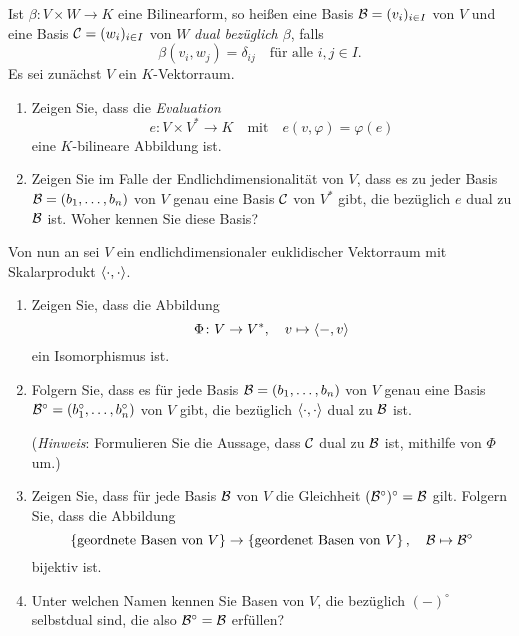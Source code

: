 \documentclass[a4paper,10pt]{scrartcl}
\begin{document}
\begin{question}
  Ist $\beta \colon V \times W \to K$ eine Bilinearform, so heißen eine Basis $\mathcal{B} = (v_i)_{i \in I}$ von $V$ und eine Basis $\mathcal{C} = (w_i)_{i \in I}$ von $W$ \emph{dual bezüglich $\beta$}, falls
  \[
    \beta(v_i, w_j) = \delta_{ij}
    \quad
    \text{für alle $i, j \in I$}.
  \]
  Es sei zunächst $V$ ein $K$-Vektorraum.
  \begin{enumerate}
    \item
      Zeigen Sie, dass die \emph{Evaluation}
      \[
        e \colon V \times V^* \to K
        \quad\text{mit}\quad
        e(v, \varphi) = \varphi(e)
      \]
      eine $K$-bilineare Abbildung ist.
    \item
      Zeigen Sie im Falle der Endlichdimensionalität von $V$, dass es zu jeder Basis $\mathcal{B} = (b_1, \dotsc, b_n)$ von $V$ genau eine Basis $\mathcal{C}$ von $V^*$ gibt, die bezüglich $e$ dual zu $\mathcal{B}$ ist.
      Woher kennen Sie diese Basis?
  \end{enumerate}
  Von nun an sei $V$ ein endlichdimensionaler euklidischer Vektorraum mit Skalarprodukt $\langle \cdot, \cdot \rangle$.
  \begin{enumerate}[resume]
    \item
      Zeigen Sie, dass die Abbildung
      \[
        \Phi \colon V \to V^*,
        \quad
        v \mapsto \langle -, v \rangle
      \]
      ein Isomorphismus ist.
    \item
      Folgern Sie, dass es für jede Basis $\mathcal{B} = (b_1, \dotsc, b_n)$ von $V$ genau eine Basis $\mathcal{B}^\circ = (b_1^\circ, \dotsc, b_n^\circ)$ von $V$ gibt, die bezüglich $\langle \cdot, \cdot \rangle$ dual zu $\mathcal{B}$ ist.
      
      (\emph{Hinweis}:
       Formulieren Sie die Aussage, dass $\mathcal{C}$ dual zu $\mathcal{B}$ ist, mithilfe von $\Phi$ um.)
    \item
      Zeigen Sie, dass für jede Basis $\mathcal{B}$ von $V$ die Gleichheit $(\mathcal{B}^\circ)^\circ = \mathcal{B}$ gilt.
      Folgern Sie, dass die Abbildung
      \[
            \left\{ \text{geordnete Basen von $V$} \right\}
        \to \left\{ \text{geordenet Basen von $V$} \right\},
        \quad
        \mathcal{B} \mapsto \mathcal{B}^\circ
      \]
      bijektiv ist.
    \item
      Unter welchen Namen kennen Sie Basen von $V$, die bezüglich $(-)^\circ$ selbstdual sind, die also $\mathcal{B}^\circ = \mathcal{B}$ erfüllen?
  \end{enumerate}
\end{question}
\end{document}
